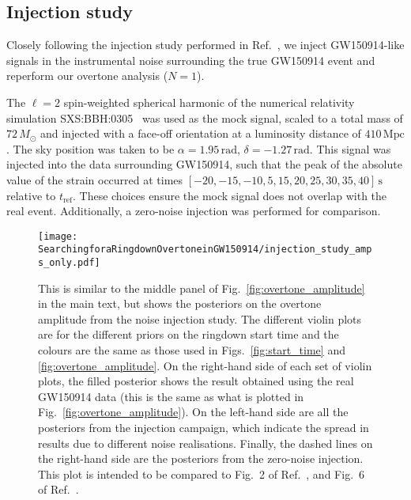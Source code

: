 \subsection{Injection study}\label{app:inj}

Closely following the injection study performed in Ref.~\cite{Cotesta:2022pci}, we inject GW150914-like signals in the instrumental noise surrounding the true GW150914 event and reperform our overtone analysis ($N=1$).

The $\ell=2$ spin-weighted spherical harmonic of the numerical relativity simulation SXS:BBH:0305~\cite{Lovelace:2016uwp} was used as the mock signal, scaled to a total mass of $72\,M_\odot$ and injected with a face-off orientation at a luminosity distance of $410\,\mathrm{Mpc}$. 
The sky position was taken to be $\alpha = 1.95\,\mathrm{rad}$, $\delta=-1.27\,\mathrm{rad}$.
This signal was injected into the data surrounding GW150914, such that the peak of the absolute value of the strain occurred at times $[-20, -15, -10, 5, 15, 20, 25, 30, 35, 40]\,\mathrm{s}$ relative to $t_\mathrm{ref}$.
These choices ensure the mock signal does not overlap with the real event.
Additionally, a zero-noise injection was performed for comparison. 

\begin{figure}[t]
    \centering
    \texttt{[image: SearchingforaRingdownOvertoneinGW150914/injection\_study\_amps\_only.pdf]}
    \caption[Posteriors on the overtone amplitude from a noise injection study]{ 
    This is similar to the middle panel of Fig.~\ref{fig:overtone_amplitude} in the main text, but shows the posteriors on the overtone amplitude from the noise injection study.
    The different violin plots are for the different priors on the ringdown start time and the colours are the same as those used in Figs.~\ref{fig:start_time} and \ref{fig:overtone_amplitude}.
    On the right-hand side of each set of violin plots, the filled posterior shows the result obtained using the real GW150914 data (this is the same as what is plotted in Fig.~\ref{fig:overtone_amplitude}). 
    On the left-hand side are all the posteriors from the injection campaign, which indicate the spread in results due to different noise realisations.  
    Finally, the dashed lines on the right-hand side are the posteriors from the zero-noise injection.
    This plot is intended to be compared to Fig.~2 of Ref.~\cite{Cotesta:2022pci}, and Fig.~6 of Ref.~\cite{Isi:2022mhy}.
    }
    \label{fig:injection_study}
\end{figure}

